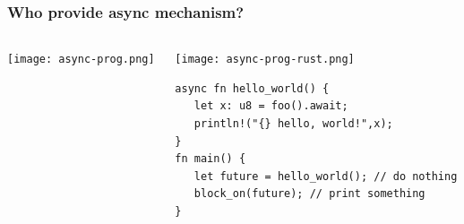 \begin{frame}[fragile]	
    \frametitle{Who provide async mechanism?}
    \begin{columns}
        \begin{column}{.3\textwidth}
            \centering
            
            \texttt{[image: async-prog.png]}
            
            
        \end{column}
        
        \begin{column}{.7\textwidth}
            \centering
            \texttt{[image: async-prog-rust.png]}
            
            \begin{block}{}
                \begin{verbatim}
async fn hello_world() {
   let x: u8 = foo().await;
   println!("{} hello, world!",x);
}
fn main() {
   let future = hello_world(); // do nothing
   block_on(future); // print something
}
                \end{verbatim}
            \end{block}
            
        \end{column}
    \end{columns}
\end{frame}
